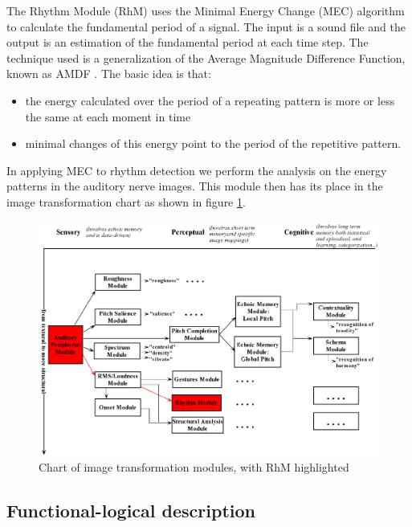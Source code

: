 The Rhythm Module (RhM) uses the Minimal Energy Change (MEC)
algorithm to calculate the fundamental period of a signal. The
input is a sound file and the output is an estimation of the
fundamental period at each time step. The technique used is a
generalization of the Average Magnitude Difference Function, known
as AMDF \cite{inproceedings:LemanVerbeke:Ieper:2000}. The basic
idea is that:
\begin{itemize}
\item
the energy calculated over the period of a repeating pattern is
more or less the same at each moment in time
\item
minimal changes of this energy point to the period of the
repetitive pattern.
\end{itemize}
In applying MEC to rhythm detection we perform the analysis on
the energy patterns in the auditory nerve images. This module
then has its place in the image transformation chart as shown in
figure \ref{Fig:ModulesRhM}.
\begin{figure}[h]
    \centering
    \includegraphics[width=\textwidth]{Graphics/ModulesRhM}
    \caption{Chart of image transformation modules, with RhM highlighted}
    \label{Fig:ModulesRhM}
\end{figure}


\subsection{Functional-logical description}

